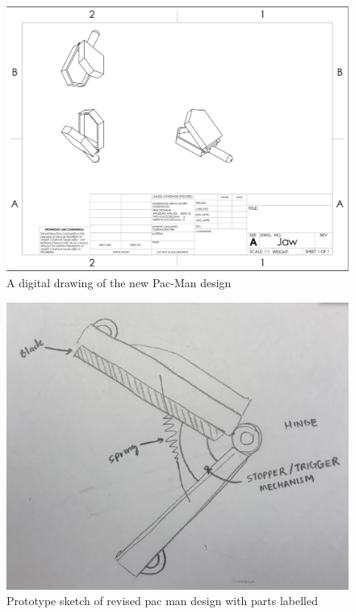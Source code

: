 \documentclass{wrcecapstone}
\begin{document}
\begin{figure}
\begin{center}
\includegraphics[width=0.8\columnwidth]{figures/fig733.png}
\end{center}
\caption{A digital drawing of the new Pac-Man design}
\label{fig:7.3.3}
\end{figure}

\begin{figure}
\begin{center}
\includegraphics[width=0.8\columnwidth]{figures/fig734.png}
\end{center}
\caption{Prototype sketch of revised pac man design with parts labelled}
\label{fig:7.3.4}
\end{figure}
\end{document}
